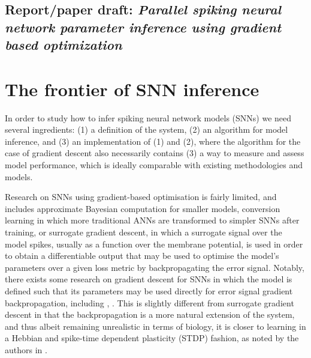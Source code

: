 \documentclass[mphil,deptreport,ianc]{infthesis} %
\begin{document}
\section{Report/paper draft: \textit{Parallel spiking neural network parameter inference using gradient based optimization}}



\chapter{The frontier of SNN inference}\label{chpt:frontier}

In order to study how to infer spiking neural network models (SNNs) we need several ingredients: (1) a definition of the system, (2) an algorithm for model inference, and (3) an implementation of (1) and (2), where the algorithm for the case of gradient descent also necessarily contains (3) a way to measure and assess model performance, which is ideally comparable with existing methodologies and models.

Research on SNNs using gradient-based optimisation is fairly limited, and includes approximate Bayesian computation for smaller models, conversion learning in which more traditional ANNs are transformed to simpler SNNs after training, or surrogate gradient descent, in which a surrogate signal over the model spikes, usually as a function over the membrane potential, is used in order to obtain a differentiable output that may be used to optimise the model's parameters over a given loss metric by backpropagating the error signal. Notably, there exists some research on gradient descent for SNNs in which the model is defined such that its parameters may be used directly for error signal gradient backpropagation, including \cite{Huh2017}, \cite{Rene2020}. This is slightly different from surrogate gradient descent in that the backpropagation is a more natural extension of the system, and thus albeit remaining unrealistic in terms of biology, it is closer to learning in a Hebbian and spike-time dependent plasticity (STDP) fashion, as noted by the authors in \cite{Huh2017}.
\end{document}
